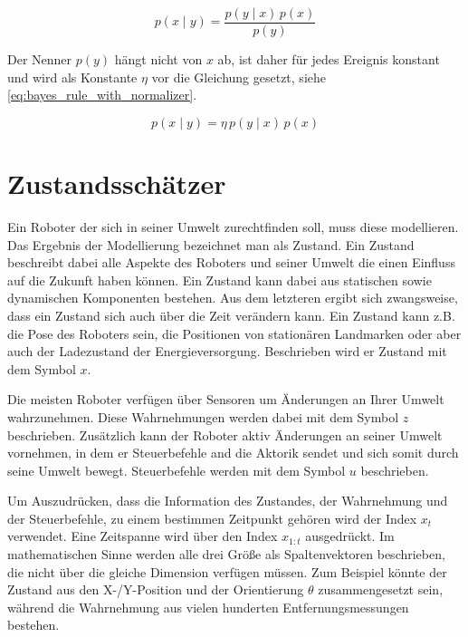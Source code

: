 \begin{equation}
p(x \mid y) = \frac{p(y \mid x) \, p(x)}{p(y)} \label{eq:bayes_rule}
\end{equation}

Der Nenner $p(y)$ hängt nicht von $x$ ab, ist daher für jedes Ereignis konstant und wird als Konstante $\eta$ vor die Gleichung gesetzt, siehe \autoref{eq:bayes_rule_with_normalizer}.

\begin{equation}
p(x \mid y) = \eta \, p(y \mid x) \, p(x) \label{eq:bayes_rule_with_normalizer}
\end{equation}


%
%
%
\section{Zustandsschätzer}
\label{sec:state_estimator}

Ein Roboter der sich in seiner Umwelt zurechtfinden soll, muss diese modellieren. Das Ergebnis der Modellierung bezeichnet man als Zustand. Ein Zustand beschreibt dabei alle Aspekte des Roboters und seiner Umwelt die einen Einfluss auf die Zukunft haben können. Ein Zustand kann dabei aus statischen sowie dynamischen Komponenten bestehen. Aus dem letzteren ergibt sich zwangsweise, dass ein Zustand sich auch über die Zeit verändern kann. Ein Zustand kann z.B. die Pose des Roboters sein, die Positionen von stationären Landmarken oder aber auch der Ladezustand der Energieversorgung. Beschrieben wird er Zustand mit dem Symbol $x$.

Die meisten Roboter verfügen über Sensoren um Änderungen an Ihrer Umwelt wahrzunehmen. Diese Wahrnehmungen werden dabei mit dem Symbol $z$ beschrieben. Zusätzlich kann der Roboter aktiv Änderungen an seiner Umwelt vornehmen, in dem er Steuerbefehle and die Aktorik sendet und sich somit durch seine Umwelt bewegt. Steuerbefehle werden mit dem Symbol $u$ beschrieben.

Um Auszudrücken, dass die Information des Zustandes, der Wahrnehmung und der Steuerbefehle, zu einem bestimmen Zeitpunkt gehören wird der Index $x_t$ verwendet. Eine Zeitspanne wird über den Index $x_{1:t}$ ausgedrückt. Im mathematischen Sinne werden alle drei Größe als Spaltenvektoren beschrieben, die nicht über die gleiche Dimension verfügen müssen. Zum Beispiel könnte der Zustand aus den X-/Y-Position und der Orientierung $\theta$ zusammengesetzt sein, während die Wahrnehmung aus vielen hunderten Entfernungsmessungen bestehen.

